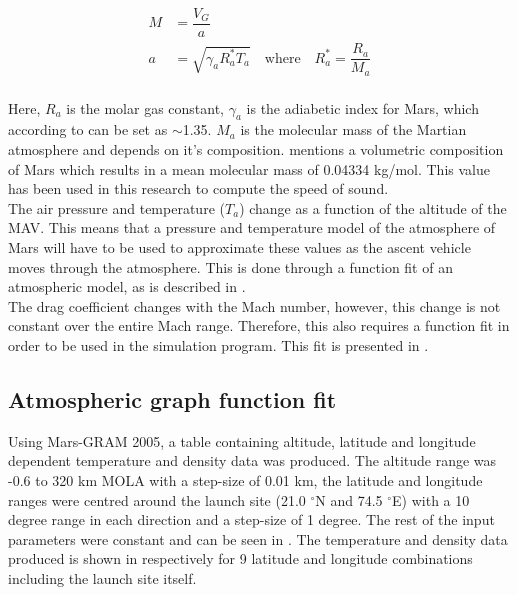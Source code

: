  \begin{equation} \label{eq:machAndSpeedOfSound}
\begin{split}
M &= \dfrac{V_{G}}{a} \\
a &= \sqrt{\gamma_{a}R_{a}^{*}T_{a}} \quad \text{where} \quad R_{a}^{*}=\dfrac{R_{a}}{M_{a}} \\
\end{split}
\end{equation}

Here, $R_{a}$ is the molar gas constant, $\gamma_{a}$ is the adiabetic index for Mars, which according to \cite{ho2002radio} can be set as $\sim$1.35. $M_{a}$ is the molecular mass of the Martian atmosphere and depends on it's composition. \cite{williams2015} mentions a volumetric composition of Mars which results in a mean molecular mass of 0.04334 kg/mol. This value has been used in this research to compute the speed of sound.\\

The air pressure and temperature ($T_{{a}}$) change as a function of the altitude of the \ac{MAV}. This means that a pressure and temperature model of the atmosphere of Mars will have to be used to approximate these values as the ascent vehicle moves through the atmosphere. This is done through a function fit of an atmospheric model, as is described in .\\

The drag coefficient changes with the Mach number, however, this change is not constant over the entire Mach range. Therefore, this also requires a function fit in order to be used in the simulation program. This fit is presented in .

\subsection{Atmospheric graph function fit}
\label{subsec:atmofuncfit}
Using Mars-\ac{GRAM} 2005, a table containing altitude, latitude and longitude dependent temperature and density data was produced. The altitude range was -0.6 to 320 km \ac{MOLA} with a step-size of 0.01 km, the latitude and longitude ranges were centred around the launch site (21.0 $^\circ$N and 74.5 $^\circ$E) with a 10 degree range in each direction and a step-size of 1 degree. The rest of the input parameters were constant and can be seen in . The temperature and density data produced is shown in  respectively for 9 latitude and longitude combinations including the launch site itself.                                                                                                                                                                                                                                                                                                                                                                                                                                                                                          


